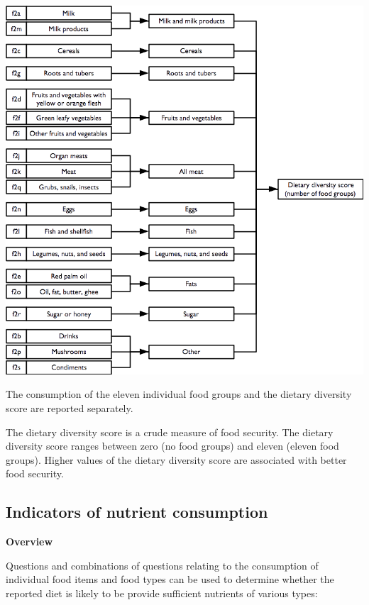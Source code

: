 \documentclass[12pt,a4paper]{book}
\theoremstyle{definition}
\theoremstyle{definition}
\theoremstyle{definition}
\theoremstyle{remark}
\begin{document}
\begin{center}\includegraphics{figures/indicators06} \end{center}

The consumption of the eleven individual food groups and the dietary
diversity score are reported separately.

The dietary diversity score is a crude measure of food security. The
dietary diversity score ranges between zero (no food groups) and eleven
(eleven food groups). Higher values of the dietary diversity score are
associated with better food security.

\hypertarget{indicators-of-nutrient-consumption}{%
\subsection{Indicators of nutrient
consumption}\label{indicators-of-nutrient-consumption}}

\textbf{Overview}

Questions and combinations of questions relating to the consumption of
individual food items and food types can be used to determine whether
the reported diet is likely to be provide sufficient nutrients of
various types:
\end{document}
